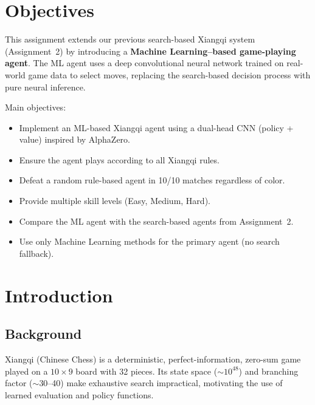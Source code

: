 \documentclass[a4paper,12pt]{article}
\begin{document}
\tableofcontents
\newpage


\section{Objectives}

This assignment extends our previous search-based Xiangqi system (Assignment~2) by introducing a \textbf{Machine Learning--based game-playing agent}. The ML agent uses a deep convolutional neural network trained on real-world game data to select moves, replacing the search-based decision process with pure neural inference.

Main objectives:
\begin{itemize}
    \item Implement an ML-based Xiangqi agent using a dual-head CNN (policy + value) inspired by AlphaZero.
    \item Ensure the agent plays according to all Xiangqi rules.
    \item Defeat a random rule-based agent in 10/10 matches regardless of color.
    \item Provide multiple skill levels (Easy, Medium, Hard).
    \item Compare the ML agent with the search-based agents from Assignment~2.
    \item Use only Machine Learning methods for the primary agent (no search fallback).
\end{itemize}


\section{Introduction}

\subsection{Background}

Xiangqi (Chinese Chess) is a deterministic, perfect-information, zero-sum game played on a $10 \times 9$ board with 32 pieces. Its state space ($\sim 10^{48}$) and branching factor ($\sim$30--40) make exhaustive search impractical, motivating the use of learned evaluation and policy functions.
\end{document}
